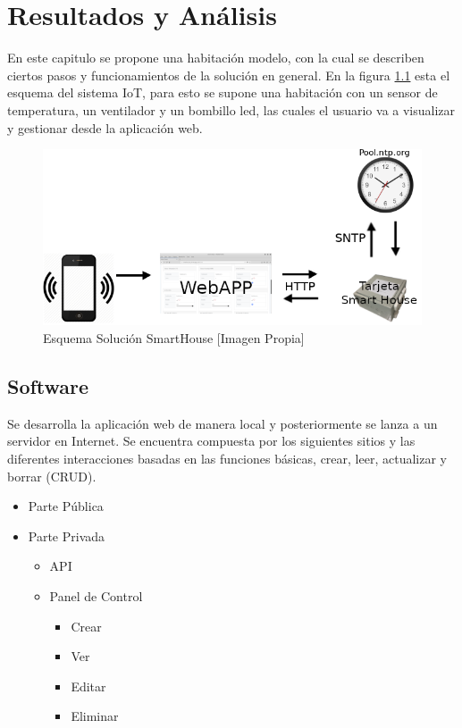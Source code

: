 \chapter{Resultados y Análisis}

En este capitulo se propone una habitación modelo, con la cual se describen ciertos pasos y funcionamientos de la solución en general. En la figura \ref{fig:iot} esta el esquema del sistema IoT, para esto se supone una habitación con un sensor de temperatura, un ventilador y un bombillo led, las cuales el usuario va a visualizar y gestionar desde la aplicación web.

\begin{figure}[H]
	\centering
	\caption{Esquema Solución SmartHouse [Imagen Propia]}
	\label{fig:iot}
	\includegraphics[width=0.6\linewidth]{Imagenes/IOT}
\end{figure}

\section{Software}

Se desarrolla la aplicación web de manera local y posteriormente se lanza a un servidor en Internet. Se encuentra compuesta por los siguientes sitios y las diferentes interacciones basadas en las funciones básicas, crear, leer, actualizar y borrar (CRUD).

\begin{itemize}
	\item Parte Pública
	\item Parte Privada
	\begin{itemize}
		\item API
		\item Panel de Control
		\begin{itemize}
			\item Crear
			\item Ver
			\item Editar
			\item Eliminar 
		\end{itemize}
	\end{itemize}
\end{itemize}

